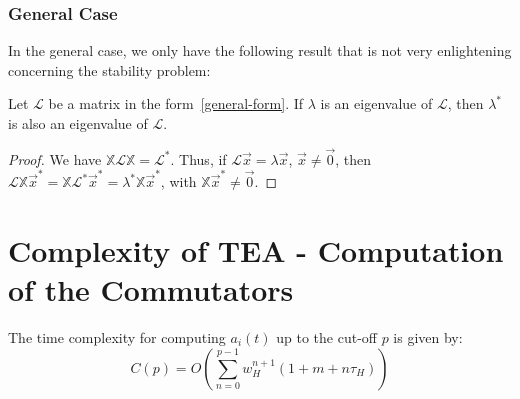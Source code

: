 \subsubsection{General Case}

In the general case, we only have the following result that is not very enlightening concerning the stability problem:

\begin{theorem}
    Let $\mathcal{L}$ be a matrix in the form~\autoref{general-form}. If $\lambda$ is an eigenvalue of $\mathcal{L}$, then $\lambda^*$ is also an eigenvalue of $\mathcal{L}$.
\end{theorem}

\begin{proof}
    We have $\mathbb{X} \mathcal{L} \mathbb{X} = \mathcal{L}^*$. Thus, if $\mathcal{L} \Vec{x} = \lambda \Vec{x}$, $\Vec{x} \neq \Vec{0}$, then $\mathcal{L} \mathbb{X} \Vec{x}^* = \mathbb{X} \mathcal{L}^* \Vec{x}^* =  \lambda^* \mathbb{X} \Vec{x}^*$, with $\mathbb{X} \Vec{x}^* \neq \Vec{0}$.
\end{proof}

\section{Complexity of TEA - Computation of the Commutators} \label{comp-tea}

\begin{theorem}
    The time complexity for computing $a_i(t)$ up to the cut-off $p$ is given by:
    \begin{equation}
        C(p) = O\left(\sum_{n=0}^{p-1} w^{n+1}_H (1+m+n \tau_H)\right)
    \end{equation}
\end{theorem}

